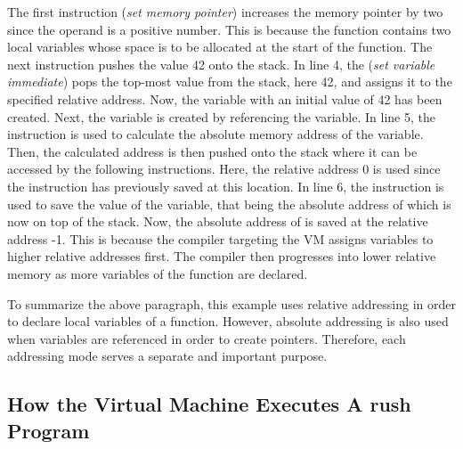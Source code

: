 
The first instruction  (\emph{set memory pointer}) increases the memory pointer by two since the operand is a positive number.
This is because the  function contains two local variables whose space is to be allocated at the start of the function.
The next instruction  pushes the value 42 onto the stack.
In line 4, the  (\emph{set variable immediate}) pops the top-most value from the stack, here 42, and assigns it to the specified relative address.
Now, the variable  with an initial value of 42 has been created.
Next, the  variable is created by referencing the  variable.
In line 5, the  instruction is used to calculate the absolute memory address of the  variable.
Then, the calculated address is then pushed onto the stack where it can be accessed by the following instructions.
Here, the relative address 0 is used since the  instruction has previously saved  at this location.
In line 6, the  instruction is used to save the value of the  variable,
that being the absolute address of  which is now on top of the stack.
Now, the absolute address of  is saved at the relative address -1.
This is because the compiler targeting the VM assigns variables to higher relative addresses first.
The compiler then progresses into lower relative memory as more variables of the function are declared.

To summarize the above paragraph, this example uses relative addressing in order to declare local variables of a function.
However, absolute addressing is also used when variables are referenced in order to create pointers.
Therefore, each addressing mode serves a separate and important purpose.

\subsection{How the Virtual Machine Executes A rush Program}

